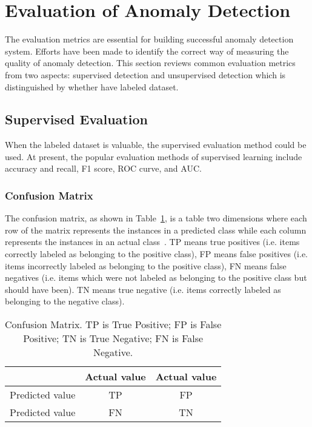 
\section{Evaluation of Anomaly Detection}

The evaluation metrics are essential for 
building successful anomaly detection system. 
Efforts have been made to identify the correct way of
measuring the quality of anomaly detection. 
This section
reviews common evaluation metrics from two aspects: 
supervised detection 
and unsupervised detection which is 
distinguished by whether have labeled dataset.

\subsection{Supervised Evaluation}
When the labeled dataset is valuable,
the supervised evaluation method could be used. 
At present, 
the popular evaluation methods of supervised learning
include accuracy and recall,
F1 score,
ROC curve,
and AUC.

\subsubsection{Confusion Matrix}
The confusion matrix,
as shown in Table~\ref{tb:confusion}, 
is a table two dimensions 
where each row of the matrix represents the instances 
in a predicted class while 
each column represents the instances 
in an actual class~\cite{powers2011evaluation}.
TP means true positives 
(i.e. items correctly labeled as belonging to the positive
class), 
FP means false positives 
(i.e. items incorrectly labeled as belonging to the
positive class), 
FN means false negatives 
(i.e. items which were not labeled as
belonging to the positive class but should have been).
TN means true negative 
(i.e. items correctly labeled as belonging to the negative
class).

\begin{table}  \centering
  \caption{Confusion Matrix. 
  TP is True Positive; 
  FP is False Positive; 
  TN is True Negative; 
  FN is False Negative. }
  \label{tb:confusion}
  \begin{tabular}{ccc}
  \toprule
    & Actual value   &  Actual value    \\
  \midrule
  Predicted value  & TP & FP  \\
  Predicted value    & FN & TN  \\
  \bottomrule
  \end{tabular}
\end{table}


